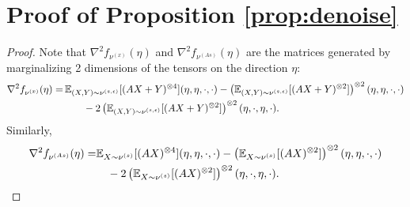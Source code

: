\section{Proof of Proposition \ref{prop:denoise}} 
\label{subsec:denoise}
\ICAPropDenoise*
\begin{proof}
	Note that $\nabla^2f_{\nu^{(x)}}(\eta)$ and $\nabla^2f_{\nu^{(As)}}(\eta)$ are the matrices generated by marginalizing 2 dimensions of the tensors on the direction $\eta$:  
	\begin{align*}
	\nabla^2f_{\nu^{(x)}}(\eta) = & \,  \mathbb{E}_{(X,Y)\sim \nu^{(s,\epsilon)}} [(AX+Y)^{\otimes 4}](\eta,\eta,\cdot,\cdot)  - \left( \mathbb{E}_{(X,Y)\sim \nu^{(s,\epsilon)}} [(AX+Y)^{\otimes 2}]\right)^{\otimes 2} (\eta,\eta,\cdot,\cdot) \\
	& \qquad - 2\left( \mathbb{E}_{(X,Y)\sim \nu^{(s,\epsilon)}} [(AX+Y)^{\otimes 2}]\right)^{\otimes 2} (\eta,\cdot,\eta,\cdot).
	\end{align*}
	Similarly, 
	\begin{align*}
	\nabla^2f_{\nu^{(As)}}(\eta) = & \mathbb{E}_{X\sim \nu^{(s)}}[(AX)^{\otimes 4}](\eta,\eta,\cdot,\cdot) - \left(\mathbb{E}_{X\sim \nu^{(s)}}[(AX)^{\otimes 2}]\right)^{\otimes 2}(\eta,\eta,\cdot,\cdot) \\
	& \quad - 2 \left(\mathbb{E}_{X\sim \nu^{(s)}}[(AX)^{\otimes 2}]\right)^{\otimes 2}(\eta,\cdot,\eta,\cdot). 
	\end{align*}
	

\end{proof}
